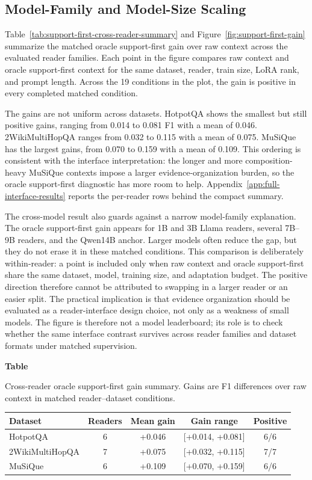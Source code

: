 \documentclass[a4paper,fleqn]{cas-sc}
\newcommand{\sidetablecaption}[2]{%
  \refstepcounter{table}\label{#1}%
  \begingroup
  \raggedright\footnotesize
  \textbf{Table~\thetable}\par
  #2\par
  \endgroup
  \vspace{3pt}
}
\begin{document}
\subsection{Model-Family and Model-Size Scaling}

Table~\ref{tab:support-first-cross-reader-summary} and
Figure~\ref{fig:support-first-gain} summarize the matched oracle support-first
gain over raw context across the evaluated reader families. Each point in the
figure compares raw context and oracle support-first context for the same
dataset, reader, train size, LoRA rank, and prompt length. Across the 19
conditions in the plot, the gain is positive in every completed matched
condition.

The gains are not uniform across datasets. HotpotQA shows the smallest but
still positive gains, ranging from 0.014 to 0.081 F1 with a mean of 0.046.
2WikiMultiHopQA ranges from 0.032 to 0.115 with a mean of 0.075. MuSiQue has
the largest gains, from 0.070 to 0.159 with a mean of 0.109. This ordering is
consistent with the interface interpretation: the longer and more
composition-heavy MuSiQue contexts impose a larger evidence-organization
burden, so the oracle support-first diagnostic has more room to help.
Appendix~\ref{app:full-interface-results} reports the per-reader rows behind
the compact summary.

The cross-model result also guards against a narrow model-family explanation.
The oracle support-first gain appears for 1B and 3B Llama readers, several 7B--9B
readers, and the Qwen14B anchor. Larger models often reduce the gap, but they
do not erase it in these matched conditions. This comparison is deliberately
within-reader: a point is included only when raw context and oracle
support-first share the same dataset, model, training size, and adaptation
budget. The positive direction therefore cannot be attributed to swapping in a
larger reader or an easier split. The practical implication is that evidence
organization should be evaluated as a reader-interface design choice, not only
as a weakness of small models. The figure is therefore not a model leaderboard;
its role is to check whether the same interface contrast survives across
reader families and dataset formats under matched supervision.

\begin{center}
\sidetablecaption{tab:support-first-cross-reader-summary}{Cross-reader oracle
support-first gain summary. Gains are F1 differences over raw context in
matched reader--dataset conditions.}
\scriptsize
\setlength{\tabcolsep}{6pt}
\begin{tabular}{lcccc}
\toprule
Dataset & Readers & Mean gain & Gain range & Positive \\
\midrule
HotpotQA & 6 & +0.046 & [+0.014, +0.081] & 6/6 \\
2WikiMultiHopQA & 7 & +0.075 & [+0.032, +0.115] & 7/7 \\
MuSiQue & 6 & +0.109 & [+0.070, +0.159] & 6/6 \\
\bottomrule
\end{tabular}
\end{center}
\end{document}
